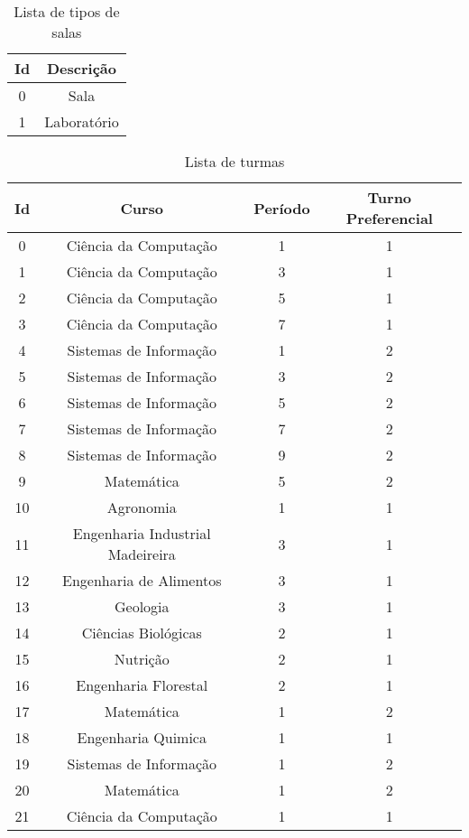 \begin{apendices}
\begin{table}[H]
\footnotesize
\centering
\begin{tabular}{|c|c|}
\hline
\textbf{Id} & \textbf{Descrição} \\ \hline
0 & Sala \\ \hline
1 & Laboratório \\ \hline
\end{tabular}
\caption{Lista de tipos de salas}
\label{ap-lista-tipo-sala-2013}
\end{table}

\begin{table}[H]
\footnotesize
\centering
\begin{tabular}{|c|c|c|c|}
\hline
\textbf{Id} & \textbf{Curso} & \textbf{Período} & \textbf{Turno Preferencial} \\ \hline
0 & Ciência da Computação & 1 & 1 \\ \hline
1 & Ciência da Computação & 3 & 1 \\ \hline
2 & Ciência da Computação & 5 & 1 \\ \hline
3 & Ciência da Computação & 7 & 1 \\ \hline
4 & Sistemas de Informação & 1 & 2 \\ \hline
5 & Sistemas de Informação & 3 & 2 \\ \hline
6 & Sistemas de Informação & 5 & 2 \\ \hline
7 & Sistemas de Informação & 7 & 2 \\ \hline
8 & Sistemas de Informação & 9 & 2 \\ \hline
9 & Matemática & 5 & 2 \\ \hline
10 & Agronomia & 1 & 1 \\ \hline
11 & Engenharia Industrial Madeireira & 3 & 1 \\ \hline
12 & Engenharia de Alimentos & 3 & 1 \\ \hline
13 & Geologia & 3 & 1 \\ \hline
14 & Ciências Biológicas & 2 & 1 \\ \hline
15 & Nutrição & 2 & 1 \\ \hline
16 & Engenharia Florestal & 2 & 1 \\ \hline
17 & Matemática & 1 & 2 \\ \hline
18 & Engenharia Quimica & 1 & 1 \\ \hline
19 & Sistemas de Informação & 1 & 2 \\ \hline
20 & Matemática & 1 & 2 \\ \hline
21 & Ciência da Computação & 1 & 1 \\ \hline
\end{tabular}
\caption{Lista de turmas}
\label{ap-lista-turmas-2013}
\end{table}


\end{apendices}
